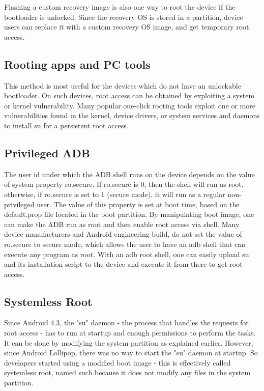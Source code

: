Flashing a custom recovery image is also one way to root the device if the bootloader is unlocked. Since the recovery OS is stored in a partition, device users can replace it with a custom recovery OS image, and get temporary root access.

\subsection{Rooting apps and PC tools}
This method is most useful for the devices which do not have an unlockable bootloader. On such devices, root access can be obtained by exploiting a system or kernel vulnerability. Many popular one-click rooting tools exploit one or more vulnerabilities found in the kernel, device drivers, or system services and daemons to install su for a persistent root access.

\subsection{Privileged ADB}
The user id under which the ADB shell runs on the device depends on the value of system property ro.secure. If ro.secure is 0, then the shell will run as root, otherwise, if ro.secure is set to 1 (secure mode), it will run as a regular non-privileged user. The value of this property is set at boot time, based on the default.prop file located in the boot partition. By manipulating boot image, one can make the ADB run as root and then enable root access via shell. Many device manufacturers and Android engineering build, do not set the value of ro.secure to secure mode, which allows the user to have an adb shell that can execute any program as root. With an adb root shell, one can easily upload su and its installation script to the device and execute it from there to get root access. 

\subsection{Systemless Root}
Since Android 4.3, the "su" daemon - the process that handles the requests for root access - has to run at startup and enough permissions to perform the tasks. It can be done by modifying the system partition as explained earlier. However, since Android Lollipop, there was no way to start the "su" daemon at startup. So developers started using a modified boot image - this is effectively called systemless root\cite{systemlessroot}, named such because it does not modify any files in the system partition.

